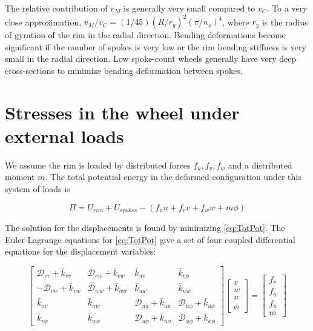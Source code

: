 \documentclass[../thesis.tex]{subfiles}
\newcommand{\D}{\mathcal{D}}
\begin{document}
The relative contribution of $v_M$ is generally very small compared to $v_C$. To a very close approximation, $v_M/v_C=(1/45)(R/r_y)^2(\pi/n_s)^4$, where $r_y$ is the radius of gyration of the rim in the radial direction. Bending deformations become significant if the number of spokes is very low or the rim bending stiffness is very small in the radial direction. Low spoke-count wheels generally have very deep cross-sections to minimize bending deformation between spokes.


\section{Stresses in the wheel under external loads}

We assume the rim is loaded by distributed forces $f_u,f_v,f_w$ and a distributed moment $m$. The total potential energy in the deformed configuration under this system of loads is

\begin{equation}
\label{eq:TotPot}
\Pi = U_{rim} + U_{spokes} - (f_uu+f_vv+f_ww+m\phi)
\end{equation}

The solution for the displacements is found by minimizing \eqref{eq:TotPot}. The Euler-Lagrange equations for \eqref{eq:TotPot} give a set of four coupled differential equations for the displacement variables:

\begin{equation}
\label{eq:EulerLagrange}
\begin{bmatrix}
 \D_{vv} + \bar{k}_{vv} & \D_{vw} + \bar{k}_{vw} & \bar{k}_{uv} & \bar{k}_{v\phi}\\
-\D_{vw} + \bar{k}_{vw} & \D_{ww} + \bar{k}_{ww} & \bar{k}_{uw} & \bar{k}_{w\phi}\\
\bar{k}_{uv}    & \bar{k}_{uw}    & \D_{uu} + \bar{k}_{uu} & \D_{u\phi} + \bar{k}_{u\phi}\\
\bar{k}_{v\phi} & \bar{k}_{w\phi} & \D_{u\phi} + \bar{k}_{u\phi} & \D_{\phi\phi} + \bar{k}_{\phi\phi}
\end{bmatrix}
\begin{bmatrix}
v\\w\\u\\\phi
\end{bmatrix}=
\begin{bmatrix}
f_v\\f_w\\f_u\\m
\end{bmatrix}
\end{equation}
\end{document}

